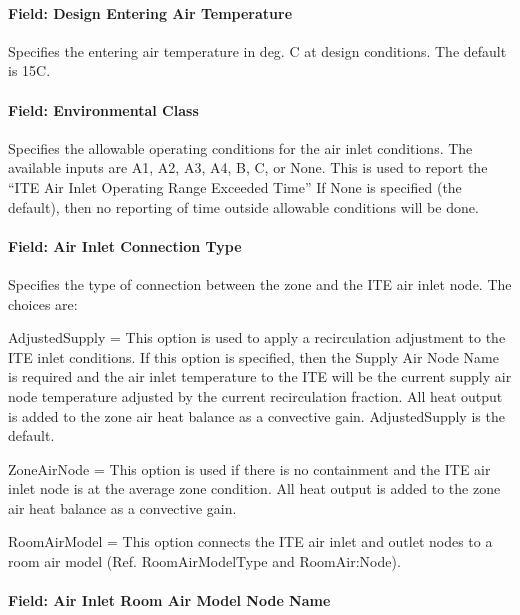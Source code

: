 \paragraph{Field: Design Entering Air Temperature}\label{field-design-entering-air-temperature}

Specifies the entering air temperature in deg. C at design conditions. The default is 15C.

\paragraph{Field: Environmental Class}\label{field-environmental-class}

Specifies the allowable operating conditions for the air inlet conditions. The available inputs are A1, A2, A3, A4, B, C, or None. This is used to report the ``ITE Air Inlet Operating Range Exceeded Time'' If None is specified (the default), then no reporting of time outside allowable conditions will be done.

\paragraph{Field: Air Inlet Connection Type}\label{field-air-inlet-connection-type}

Specifies the type of connection between the zone and the ITE air inlet node. The choices are:

AdjustedSupply = This option is used to apply a recirculation adjustment to the ITE inlet conditions. If this option is specified, then the Supply Air Node Name is required and the air inlet temperature to the ITE will be the current supply air node temperature adjusted by the current recirculation fraction. All heat output is added to the zone air heat balance as a convective gain. AdjustedSupply is the default.

ZoneAirNode = This option is used if there is no containment and the ITE air inlet node is at the average zone condition. All heat output is added to the zone air heat balance as a convective gain.

RoomAirModel = This option connects the ITE air inlet and outlet nodes to a room air model (Ref. RoomAirModelType and RoomAir:Node).

\paragraph{Field: Air Inlet Room Air Model Node Name}\label{field-air-inlet-room-air-model-node-name}

